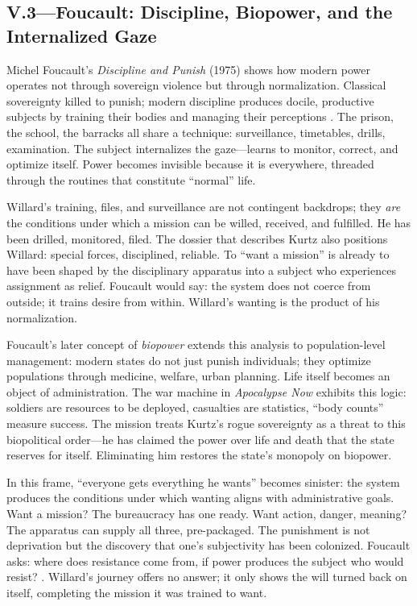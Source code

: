 \subsection*{V.3—Foucault: Discipline, Biopower, and the Internalized Gaze}
\label{ssec:v-foucault}
Michel Foucault's \textit{Discipline and Punish} (1975) shows how modern power operates not
through sovereign violence but through normalization. Classical sovereignty killed to punish;
modern discipline produces docile, productive subjects by training their bodies and managing
their perceptions \parencite{FoucaultDiscipline1995}. The prison, the school, the barracks all
share a technique: surveillance, timetables, drills, examination. The subject internalizes the
gaze---learns to monitor, correct, and optimize itself. Power becomes invisible because it is
everywhere, threaded through the routines that constitute ``normal'' life.

Willard's training, files, and surveillance are not contingent backdrops; they \emph{are} the
conditions under which a mission can be willed, received, and fulfilled. He has been drilled,
monitored, filed. The dossier that describes Kurtz also positions Willard: special forces,
disciplined, reliable. To ``want a mission'' is already to have been shaped by the disciplinary
apparatus into a subject who experiences assignment as relief. Foucault would say: the system
does not coerce from outside; it trains desire from within. Willard's wanting is the product of
his normalization.

Foucault's later concept of \emph{biopower} extends this analysis to population-level
management: modern states do not just punish individuals; they optimize populations through
medicine, welfare, urban planning. Life itself becomes an object of
administration. The war machine in \textit{Apocalypse Now} exhibits this logic: soldiers are
resources to be deployed, casualties are statistics, ``body counts'' measure success. The
mission treats Kurtz's rogue sovereignty as a threat to this biopolitical order---he has
claimed the power over life and death that the state reserves for itself. Eliminating him
restores the state's monopoly on biopower.

In this frame, ``everyone gets everything he wants'' becomes sinister: the system produces the
conditions under which wanting aligns with administrative goals. Want a mission? The bureaucracy
has one ready. Want action, danger, meaning? The apparatus can supply all three, pre-packaged.
The punishment is not deprivation but the discovery that one's subjectivity has been colonized.
Foucault asks: where does resistance come from, if power produces the subject who would resist?
\parencite{FoucaultDiscipline1995}. Willard's journey offers no answer; it only shows the will
turned back on itself, completing the mission it was trained to want.

